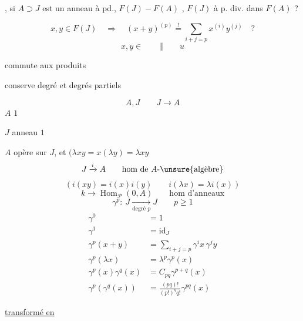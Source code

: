 
, si $A\supset J$ est un anneau à pd.,  $F(J)-F(A)$ ,  $F(J)$ à p. div. dans $F(A)$ ?


\[
x,y\in F(J)\quad\Longrightarrow\quad
(x+y)^{(p)}\overset{!}{=}\sum_{i+j=p}x^{(i)}y^{(j)}\quad?
\]
\[x,y\in\qquad\Vert\qquad u\]

commute aux produits\par
conserve degré et degrés partiels

\[
A,J\qquad J\longrightarrow A
\]
$A$    $1$\par
$J$ anneau  $1$\par
$A$ opère sur $J$, et $(\lambda xy=x(\lambda y)=\lambda xy$
\[
J\xrightarrow{i} A\qquad\text{hom de }A\text{-}\unsure{\text{algèbre}}
\]
\[
(i(xy)=i(x)i(y)\qquad i(\lambda x)=\lambda i(x))
\]
\[
k\longrightarrow\operatorname{Hom}_{\mathcal P}(0,A)\qquad\text{hom d'anneaux}
\]
\[
\gamma^p:\ J\xrightarrow[\text{degré }p]{}J\qquad p\geq1
\]
\[
\begin{aligned}
\gamma^0&=1\\
\gamma^1&=\mathrm{id}_J\\
\gamma^p(x+y)&=\sum_{i+j=p}\gamma^i x\,\gamma^j y\\
\gamma^p(\lambda x)&=\lambda^p\gamma^p(x)\\
\gamma^p(x)\gamma^q(x)&=C_{pq}\gamma^{p+q}(x)\\
\gamma^p(\gamma^q(x))&=\frac{(pq)!}{(p!)^q q!}\gamma^{pq}(x)
\end{aligned}
\]

\uline{transformé en }


